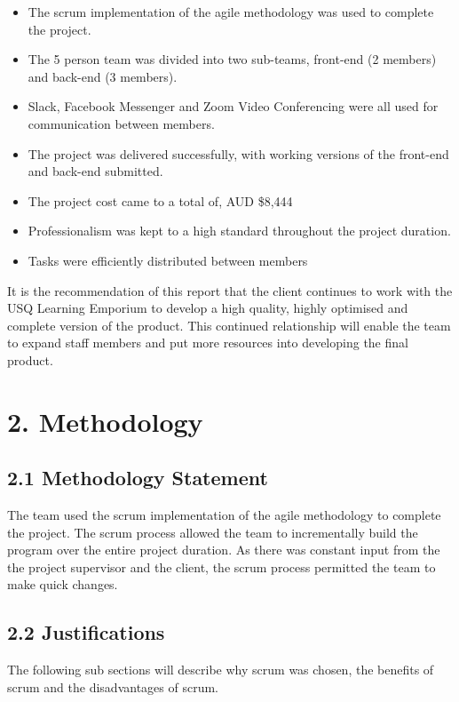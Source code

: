 \documentclass[11pt]{article}
\begin{document}
\begin{itemize}
\item The scrum implementation of the agile methodology was used to complete the project.
\item The 5 person team was divided into two sub-teams, front-end (2 members) and back-end (3 members).
\item Slack, Facebook Messenger and Zoom Video Conferencing were all used for communication between members.
\item The project was delivered successfully, with working versions of the front-end and back-end submitted.
\item The project cost came to a total of, AUD \$8,444
\item Professionalism was kept to a high standard throughout the project duration.
\item Tasks were efficiently distributed between members
\end{itemize}

It is the recommendation of this report that the client continues to work with the USQ Learning Emporium to develop a high quality, highly optimised and complete version of the product. This continued relationship will enable the team to expand staff members and put more resources into developing the final product.


\newpage




\section{2. Methodology}

\subsection{2.1 Methodology Statement}
The team used the scrum implementation of the agile methodology to complete the project. The scrum process allowed the team to incrementally build the program over the entire project duration. As there was constant input from the the project supervisor and the client, the scrum process permitted the team to make quick changes.

\subsection{2.2 Justifications}
The following sub sections will describe why scrum was chosen, the benefits of scrum and the disadvantages of scrum.
\end{document}
